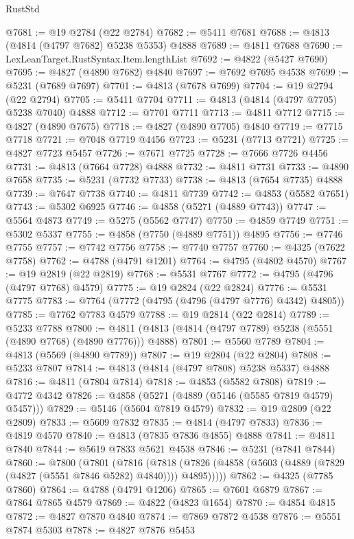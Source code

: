 \begin{lexlean}{RustStd}
\begin{coremodule}
@7681 := @19 @2784 (@22 @2784)
@7682 := @5411 @7681
@7688 := @4813 (@4814 (@4797 @7682) @5238 @5353) @4888
@7689 := @4811 @7688
@7690 := LexLeanTarget.RustSyntax.Item.lengthList
@7692 := @4822 (@5427 @7690)
@7695 := @4827 (@4890 @7682) @4840
@7697 := @7692 @7695 @4538
@7699 := @5231 (@7689 @7697)
@7701 := @4813 (@7678 @7699)
@7704 := @19 @2794 (@22 @2794)
@7705 := @5411 @7704
@7711 := @4813 (@4814 (@4797 @7705) @5238 @7040) @4888
@7712 := @7701 @7711
@7713 := @4811 @7712
@7715 := @4827 (@4890 @7675)
@7718 := @4827 (@4890 @7705) @4840
@7719 := @7715 @7718
@7721 := @7048 @7719 @4456
@7723 := @5231 (@7713 @7721)
@7725 := @4827 @7723 @5457
@7726 := @7671 @7725
@7728 := @7666 @7726 @4456
@7731 := @4813 (@7664 @7728) @4888
@7732 := @4811 @7731
@7733 := @4890 @7658
@7735 := @5231 (@7732 @7733)
@7738 := @4813 (@7654 @7735) @4888
@7739 := @7647 @7738
@7740 := @4811 @7739
@7742 := @4853 (@5582 @7651)
@7743 := @5302 @6925
@7746 := @4858 (@5271 (@4889 @7743))
@7747 := @5564 @4873
@7749 := @5275 (@5562 @7747)
@7750 := @4859 @7749
@7751 := @5302 @5337
@7755 := @4858 (@7750 (@4889 @7751)) @4895
@7756 := @7746 @7755
@7757 := @7742 @7756
@7758 := @7740 @7757
@7760 := @4325 (@7622 @7758)
@7762 := @4788 (@4791 @1201)
@7764 := @4795 (@4802 @4570)
@7767 := @19 @2819 (@22 @2819)
@7768 := @5531 @7767
@7772 := @4795 (@4796 (@4797 @7768) @4579)
@7775 := @19 @2824 (@22 @2824)
@7776 := @5531 @7775
@7783 := @7764 (@7772 (@4795 (@4796 (@4797 @7776) @4342) @4805))
@7785 := @7762 @7783 @4579
@7788 := @19 @2814 (@22 @2814)
@7789 := @5233 @7788
@7800 := @4811 (@4813 (@4814 (@4797 @7789) @5238 (@5551 (@4890 @7768) (@4890 @7776))) @4888)
@7801 := @5560 @7789
@7804 := @4813 (@5569 (@4890 @7789))
@7807 := @19 @2804 (@22 @2804)
@7808 := @5233 @7807
@7814 := @4813 (@4814 (@4797 @7808) @5238 @5337) @4888
@7816 := @4811 (@7804 @7814)
@7818 := @4853 (@5582 @7808)
@7819 := @4772 @4342
@7826 := @4858 (@5271 (@4889 (@5146 (@5585 @7819 @4579) @5457)))
@7829 := @5146 (@5604 @7819 @4579)
@7832 := @19 @2809 (@22 @2809)
@7833 := @5609 @7832
@7835 := @4814 (@4797 @7833)
@7836 := @4819 @4570
@7840 := @4813 (@7835 @7836 @4855) @4888
@7841 := @4811 @7840
@7844 := @5619 @7833 @5621 @4538
@7846 := @5231 (@7841 @7844)
@7860 := @7800
    (@7801
      (@7816
        (@7818 (@7826 (@4858 (@5603 (@4889 (@7829 (@4827 (@5551 @7846 @5282) @4840)))) @4895)))))
@7862 := @4325 (@7785 @7860)
@7864 := @4788 (@4791 @1206)
@7865 := @7601 @6879
@7867 := @7864 @7865 @4579
@7869 := @4822 (@4823 @1654)
@7870 := @4854 @4815
@7872 := @4827 @7870 @4840
@7874 := @7869 @7872 @4538
@7876 := @5551 @7874 @5303
@7878 := @4827 @7876 @5453

\end{coremodule}
\end{lexlean}

